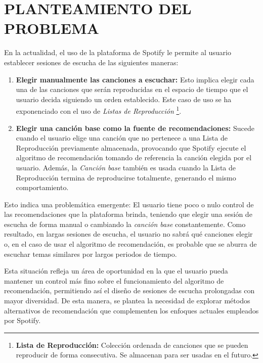 \newpage
\thispagestyle{plain}
\vspace*{0.2cm}

\section*{PLANTEAMIENTO DEL PROBLEMA}

En la actualidad, el uso de la plataforma de Spotify le permite al usuario establecer sesiones de escucha de las siguientes maneras:

\begin{enumerate}
    \item \textbf{Elegir manualmente las canciones a escuchar:} Esto implica elegir cada una de las canciones que serán reproducidas en el espacio de tiempo que el usuario decida siguiendo un orden establecido. Este caso de uso se ha exponenciado con el uso de \textit{Listas de Reproducción} \footnote{\textbf{Lista de Reproducción: } Colección ordenada de canciones que se pueden reproducir de forma consecutiva. Se almacenan para ser usadas en el futuro.}.

    \item \textbf{Elegir una canción base como la fuente de recomendaciones:} Sucede cuando el usuario elige una canción que no pertenece a una Lista de Reproducción previamente almacenada, provocando que Spotify ejecute el algoritmo de recomendación tomando de referencia la canción elegida por el usuario. Además, la \textit{Canción base} también es usada cuando la Lista de Reproducción termina de reproducirse totalmente, generando el mismo comportamiento.
\end{enumerate}

Esto indica una problemática emergente: El usuario tiene poco o nulo control de las recomendaciones que la plataforma brinda, teniendo que elegir una sesión de escucha de forma manual o cambiando la \textit{canción base} constantemente. Como resultado, en largas sesiones de escucha, el usuario no sabrá qué canciones elegir o, en el caso de usar el algoritmo de recomendación, es probable que se aburra de escuchar temas similares por largos periodos de tiempo.

Esta situación refleja un área de oportunidad en la que el usuario pueda mantener un control más fino sobre el funcionamiento del algoritmo de recomendación, permitiendo así el diseño de sesiones de escucha prolongadas con mayor diversidad. De esta manera, se plantea la necesidad de explorar métodos alternativos de recomendación que complementen los enfoques actuales empleados por Spotify.

